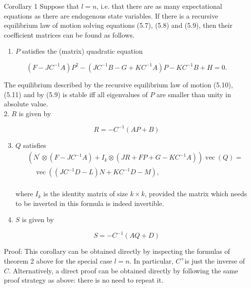 \documentclass[10pt]{article}
\begin{document}
Corollary 1 Suppose that $l=n$, i.e. that there are as many expectational equations as there are endogenous state variables. If there is a recursive equilibrium law of motion solving equations (5.7), (5.8) and (5.9), then their coefficient matrices can be found as follows.

\begin{enumerate}
  \item $P$ satisfies the (matrix) quadratic equation
\end{enumerate}

\begin{equation*}
\left(F-J C^{-1} A\right) P^{2}-\left(J C^{-1} B-G+K C^{-1} A\right) P-K C^{-1} B+H=0 . \tag{5.18}
\end{equation*}

The equilibrium described by the recursive equilibrium law of motion (5.10), (5.11) and by (5.9) is stable iff all eigenvalues of $P$ are smaller than unity in absolute value.\\
2. $R$ is given by

\begin{equation*}
R=-C^{-1}(A P+B)
\end{equation*}

\begin{enumerate}
  \setcounter{enumi}{2}
  \item $Q$ satisfies\\
\begin{align*}
& \left(N^{\prime} \otimes\left(F-J C^{-1} A\right)+I_{k} \otimes\left(J R+F P+G-K C^{-1} A\right)\right) \operatorname{vec}(Q)= \\
& \quad \operatorname{vec}\left(\left(J C^{-1} D-L\right) N+K C^{-1} D-M\right), \tag{5.19}
\end{align*}\\
where $I_{k}$ is the identity matrix of size $k \times k$, provided the matrix which needs to be inverted in this formula is indeed invertible.
  \item $S$ is given by
\end{enumerate}

\begin{equation*}
S=-C^{-1}(A Q+D)
\end{equation*}

Proof: This corollary can be obtained directly by inspecting the formulas of theorem 2 above for the special case $l=n$. In particular, $C^{+}$is just the inverse of $C$. Alternatively, a direct proof can be obtained directly by following the same proof strategy as above: there is no need to repeat it.
\end{document}
